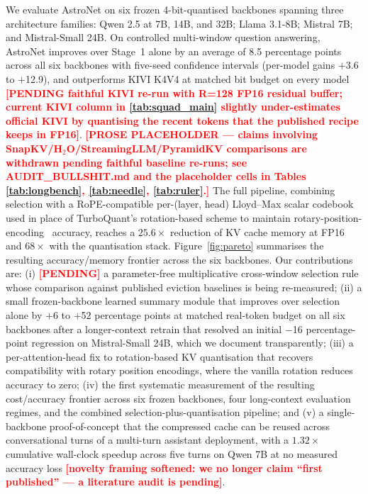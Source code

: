 \documentclass[sn-nature,Numbered]{sn-jnl}
\begin{document}
We evaluate AstroNet on six frozen 4-bit-quantised backbones spanning three architecture families: Qwen 2.5 at 7B, 14B, and 32B; Llama 3.1-8B; Mistral 7B; and Mistral-Small 24B. On controlled multi-window question answering, AstroNet improves over Stage~1 alone by an average of 8.5 percentage points across all six backbones with five-seed confidence intervals (per-model gains $+$3.6 to $+$12.9), and outperforms KIVI K4V4 at matched bit budget on every model \textcolor{red}{\textbf{[PENDING faithful KIVI re-run with R=128 FP16 residual buffer; current KIVI column in \cref{tab:squad_main} slightly under-estimates official KIVI by quantising the recent tokens that the published recipe keeps in FP16]}}. \textcolor{red}{\textbf{[PROSE PLACEHOLDER — claims involving SnapKV/H$_2$O/StreamingLLM/PyramidKV comparisons are withdrawn pending faithful baseline re-runs; see AUDIT\_BULLSHIT.md and the placeholder cells in Tables \ref{tab:longbench}, \ref{tab:needle}, \ref{tab:ruler}.]}} The full pipeline, combining selection with a RoPE-compatible per-(layer, head) Lloyd--Max scalar codebook used in place of TurboQuant's rotation-based scheme to maintain rotary-position-encoding~\cite{su2024rope} accuracy, reaches a $25.6\times$ reduction of KV cache memory at FP16 and $68\times$ with the quantisation stack. Figure~\ref{fig:pareto} summarises the resulting accuracy/memory frontier across the six backbones. Our contributions are: (i) \textcolor{red}{\textbf{[PENDING]}} a parameter-free multiplicative cross-window selection rule whose comparison against published eviction baselines is being re-measured; (ii) a small frozen-backbone learned summary module that improves over selection alone by $+$6 to $+$52 percentage points at matched real-token budget on all six backbones after a longer-context retrain that resolved an initial $-$16 percentage-point regression on Mistral-Small 24B, which we document transparently; (iii) a per-attention-head fix to rotation-based KV quantisation that recovers compatibility with rotary position encodings, where the vanilla rotation reduces accuracy to zero; (iv) the first systematic measurement of the resulting cost/accuracy frontier across six frozen backbones, four long-context evaluation regimes, and the combined selection-plus-quantisation pipeline; and (v) a single-backbone proof-of-concept that the compressed cache can be reused across conversational turns of a multi-turn assistant deployment, with a $1.32\times$ cumulative wall-clock speedup across five turns on Qwen 7B at no measured accuracy loss \textcolor{red}{\textbf{[novelty framing softened: we no longer claim ``first published'' --- a literature audit is pending]}}.
\end{document}
